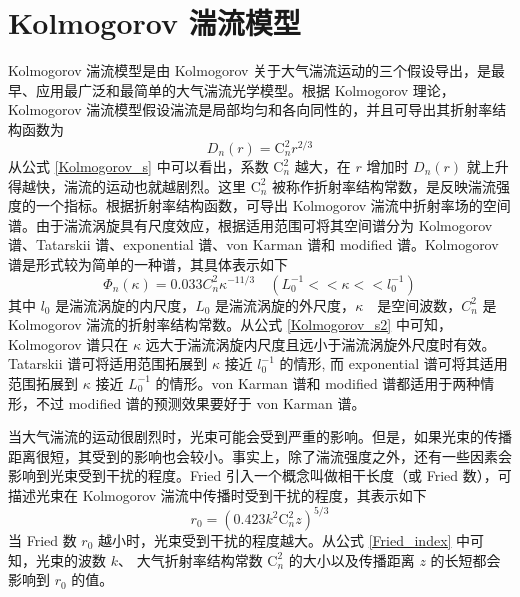 \documentclass[master]{thesis-uestc}
\begin{document}
\section{Kolmogorov 湍流模型}
Kolmogorov 湍流模型是由 Kolmogorov 关于大气湍流运动的三个假设导出，是最早、应用最广泛和最简单的大气湍流光学模型。根据 Kolmogorov 理论，Kolmogorov 湍流模型假设湍流是局部均匀和各向同性的，并且可导出其折射率结构函数为
\begin{equation}\label{Kolmogorov_s}
D_{n}(r)=\mathrm{C}^2_{n}r^{2/3}
\end{equation}
从公式 \eqref{Kolmogorov_s} 中可以看出，系数 $\mathrm{C}^2_{n}$ 越大，在 $r$ 增加时 $D_{n}(r)$ 就上升得越快，湍流的运动也就越剧烈。这里 $\mathrm{C}^2_{n}$ 被称作折射率结构常数，是反映湍流强度的一个指标。根据折射率结构函数，可导出 Kolmogorov 湍流中折射率场的空间谱。由于湍流涡旋具有尺度效应，根据适用范围可将其空间谱分为 Kolmogorov 谱、Tatarskii 谱、exponential 谱、von Karman 谱和 modified 谱。Kolmogorov 谱是形式较为简单的一种谱，其具体表示如下
\begin{equation}\label{Kolmogorov_s2}
\Phi_{n}(\kappa)=0.033C_n^{2}\kappa^{-11/3}\quad(L_{0}^{-1}<<\kappa<<l_{0}^{-1})
\end{equation}
其中 $l_{0}$ 是湍流涡旋的内尺度，$L_{0}$ 是湍流涡旋的外尺度，$\kappa$　是空间波数，$C_n^{2}$ 是 Kolmogorov 湍流的折射率结构常数。从公式 \eqref{Kolmogorov_s2} 中可知，Kolmogorov 谱只在 $\kappa$ 远大于湍流涡旋内尺度且远小于湍流涡旋外尺度时有效。Tatarskii 谱可将适用范围拓展到 $\kappa$ 接近 $l_{0}^{-1}$ 的情形, 而 exponential 谱可将其适用范围拓展到 $\kappa$ 接近 $L_{0}^{-1}$ 的情形。von Karman 谱和 modified 谱都适用于两种情形，不过 modified 谱的预测效果要好于 von Karman 谱。

当大气湍流的运动很剧烈时，光束可能会受到严重的影响。但是，如果光束的传播距离很短，其受到的影响也会较小。事实上，除了湍流强度之外，还有一些因素会影响到光束受到干扰的程度。Fried 引入一个概念叫做相干长度（或 Fried 数），可描述光束在 Kolmogorov 湍流中传播时受到干扰的程度，其表示如下
\begin{equation}\label{Fried_index}
r_0=\left(0.423k^2\mathrm{C}^2_{n}z\right)^{5/3}
\end{equation}
当 Fried 数 $r_0$ 越小时，光束受到干扰的程度越大。从公式 \eqref{Fried_index} 中可知，光束的波数 $k$、 大气折射率结构常数 $\mathrm{C}^2_{n}$ 的大小以及传播距离 $z$ 的长短都会影响到 $r_0$ 的值。
\end{document}
